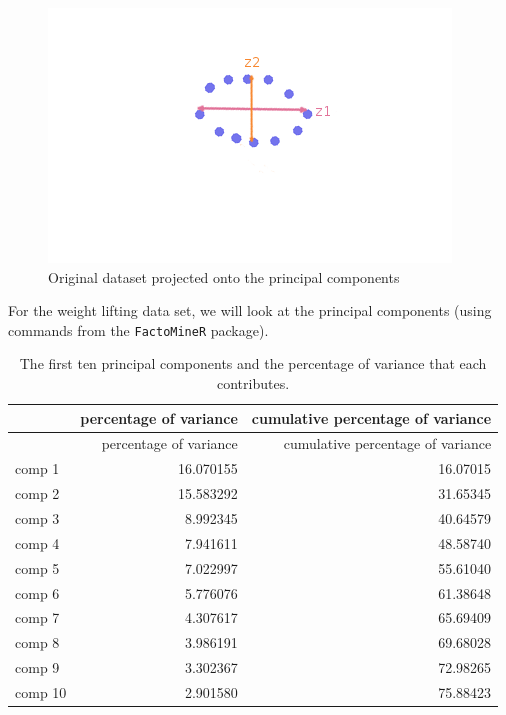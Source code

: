\documentclass[12pt,twoside]{reedthesis}
\begin{document}
  \begin{figure}[htbp]
  \centering
  \includegraphics{figure/ProjectedPC.png}
  \caption{Original dataset projected onto the principal components}
  \end{figure}
  
  \newpage
  
  For the weight lifting data set, we will look at the principal
  components (using commands from the \texttt{FactoMineR} package).
  
  \begin{Shaded}
  \begin{Highlighting}[]
  \StringTok{ }\NormalTok{(wl2[, -}\NormalTok{(}\NormalTok{,}\NormalTok{,}\NormalTok{)], } \NormalTok{)}
  
  \end{Highlighting}
  \end{Shaded}
  
  \begin{longtable}[c]{@{}lrr@{}}
  \caption{The first ten principal components and the percentage of
  variance that each contributes.}\tabularnewline
  \toprule
  & percentage of variance & cumulative percentage of
  variance\tabularnewline
  \midrule
  \endfirsthead
  \toprule
  & percentage of variance & cumulative percentage of
  variance\tabularnewline
  \midrule
  \endhead
  comp 1 & 16.070155 & 16.07015\tabularnewline
  comp 2 & 15.583292 & 31.65345\tabularnewline
  comp 3 & 8.992345 & 40.64579\tabularnewline
  comp 4 & 7.941611 & 48.58740\tabularnewline
  comp 5 & 7.022997 & 55.61040\tabularnewline
  comp 6 & 5.776076 & 61.38648\tabularnewline
  comp 7 & 4.307617 & 65.69409\tabularnewline
  comp 8 & 3.986191 & 69.68028\tabularnewline
  comp 9 & 3.302367 & 72.98265\tabularnewline
  comp 10 & 2.901580 & 75.88423\tabularnewline
  \bottomrule
  \end{longtable}
  
\end{document}
